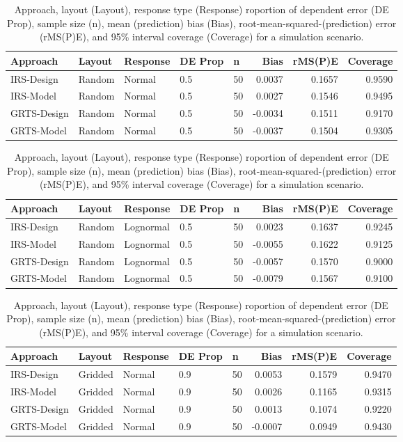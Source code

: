 \documentclass[]{elsarticle} %
\begin{document}
\begin{table}[ht]
\centering
\begin{tabular}{lllllrrr}
  \hline
Approach & Layout & Response & DE Prop & n & Bias & rMS(P)E & Coverage \\ 
  \hline
IRS-Design & Random & Normal & 0.5 & 50 & 0.0037 & 0.1657 & 0.9590 \\ 
  IRS-Model & Random & Normal & 0.5 & 50 & 0.0027 & 0.1546 & 0.9495 \\ 
  GRTS-Design & Random & Normal & 0.5 & 50 & -0.0034 & 0.1511 & 0.9170 \\ 
  GRTS-Model & Random & Normal & 0.5 & 50 & -0.0037 & 0.1504 & 0.9305 \\ 
   \hline
\end{tabular}
\caption{Approach, layout (Layout), response type (Response) roportion of dependent error (DE Prop), sample size (n), mean (prediction) bias (Bias), root-mean-squared-(prediction) error (rMS(P)E), and 95\% interval coverage (Coverage) for a simulation scenario.} 
\end{table}
\begin{table}[ht]
\centering
\begin{tabular}{lllllrrr}
  \hline
Approach & Layout & Response & DE Prop & n & Bias & rMS(P)E & Coverage \\ 
  \hline
IRS-Design & Random & Lognormal & 0.5 & 50 & 0.0023 & 0.1637 & 0.9245 \\ 
  IRS-Model & Random & Lognormal & 0.5 & 50 & -0.0055 & 0.1622 & 0.9125 \\ 
  GRTS-Design & Random & Lognormal & 0.5 & 50 & -0.0057 & 0.1570 & 0.9000 \\ 
  GRTS-Model & Random & Lognormal & 0.5 & 50 & -0.0079 & 0.1567 & 0.9100 \\ 
   \hline
\end{tabular}
\caption{Approach, layout (Layout), response type (Response) roportion of dependent error (DE Prop), sample size (n), mean (prediction) bias (Bias), root-mean-squared-(prediction) error (rMS(P)E), and 95\% interval coverage (Coverage) for a simulation scenario.} 
\end{table}
\begin{table}[ht]
\centering
\begin{tabular}{lllllrrr}
  \hline
Approach & Layout & Response & DE Prop & n & Bias & rMS(P)E & Coverage \\ 
  \hline
IRS-Design & Gridded & Normal & 0.9 & 50 & 0.0053 & 0.1579 & 0.9470 \\ 
  IRS-Model & Gridded & Normal & 0.9 & 50 & 0.0026 & 0.1165 & 0.9315 \\ 
  GRTS-Design & Gridded & Normal & 0.9 & 50 & 0.0013 & 0.1074 & 0.9220 \\ 
  GRTS-Model & Gridded & Normal & 0.9 & 50 & -0.0007 & 0.0949 & 0.9430 \\ 
   \hline
\end{tabular}
\caption{Approach, layout (Layout), response type (Response) roportion of dependent error (DE Prop), sample size (n), mean (prediction) bias (Bias), root-mean-squared-(prediction) error (rMS(P)E), and 95\% interval coverage (Coverage) for a simulation scenario.} 
\end{table}
\end{document}
